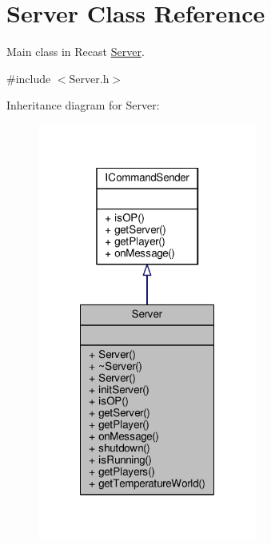 \hypertarget{class_server}{\section{Server Class Reference}
\label{class_server}
}


Main class in Recast \hyperlink{class_server}{Server}.  




{\ttfamily \#include $<$Server.\-h$>$}



Inheritance diagram for Server\-:
\nopagebreak
\begin{figure}[H]
\begin{center}
\leavevmode
\includegraphics[width=204pt]{class_server__inherit__graph}
\end{center}
\end{figure}


